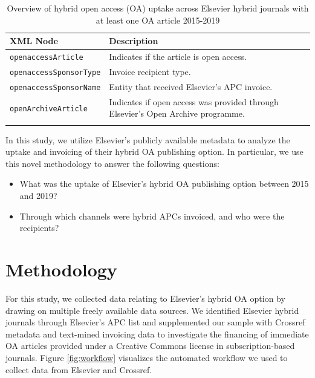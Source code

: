 \documentclass[a4paper,man,floatsintext,longtable,noextraspace,12pt]{apa6}
\begin{document}
\begin{table}[H]
\caption{\label{tab:els_xml} Overview of hybrid open access (OA) uptake across Elsevier hybrid journals with at least one OA article 2015-2019}
\centering
\begin{tabular}[t]{lp{10cm}}
\toprule
XML Node & Description\\
\midrule
\texttt{openaccessArticle} & Indicates if the article is open
access. \\
\texttt{openaccessSponsorType} & Invoice recipient type.\\
\texttt{openaccessSponsorName} & Entity that received Elsevier's APC
invoice.\\
\texttt{openArchiveArticle} & Indicates if open access was provided through
Elsevier's Open Archive programme.\tabularnewline \\
\bottomrule
\end{tabular}
\end{table}

In this study, we utilize Elsevier's publicly available metadata to
analyze the uptake and invoicing of their hybrid OA publishing option.
In particular, we use this novel methodology to answer the following
questions:

\begin{itemize}
\item
  What was the uptake of Elsevier's hybrid OA publishing option between
  2015 and 2019?
\item
  Through which channels were hybrid APCs invoiced, and who were the
  recipients?
\end{itemize}

\hypertarget{methodology}{%
\section{Methodology}\label{methodology}}

For this study, we collected data relating to Elsevier's hybrid OA
option by drawing on multiple freely available data sources. We
identified Elsevier hybrid journals through Elsevier's APC list and
supplemented our sample with Crossref metadata and text-mined invoicing
data to investigate the financing of immediate OA articles provided
under a Creative Commons license in subscription-based journals. Figure
\ref{fig:workflow} visualizes the automated workflow we used to collect
data from Elsevier and Crossref.
\end{document}
